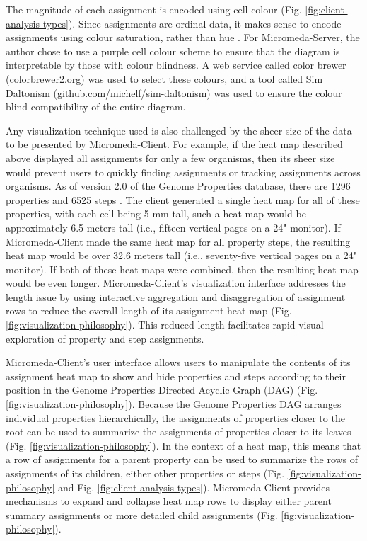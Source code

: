 The magnitude of each assignment is encoded using cell colour (Fig. \ref{fig:client-analysis-types}). Since assignments are ordinal data, it makes sense to encode assignments using colour saturation, rather than hue \cite{munzner2015visualization}. For Micromeda-Server, the author chose to use a purple cell colour scheme to ensure that the diagram is interpretable by those with colour blindness. A web service called color brewer (\href{colorbrewer2.org}{colorbrewer2.org}) was used to select these colours, and a tool called Sim Daltonism (\href{github.com/michelf/sim-daltonism}{github.com/michelf/sim-daltonism}) was used to ensure the colour blind compatibility of the entire diagram.

Any visualization technique used is also challenged by the sheer size of the data to be presented by Micromeda-Client. For example, if the heat map described above displayed all assignments for only a few organisms, then its sheer size would prevent users to quickly finding assignments or tracking assignments across organisms. As of version 2.0 of the Genome Properties database, there are 1296 properties and 6525 steps \cite{richardson2018genome}. The client generated a single heat map for all of these properties, with each cell being 5 mm tall, such a heat map would be approximately 6.5 meters tall (i.e., fifteen vertical pages on a 24" monitor). If Micromeda-Client made the same heat map for all property steps, the resulting heat map would be over 32.6 meters tall (i.e., seventy-five vertical pages on a 24" monitor). If both of these heat maps were combined, then the resulting heat map would be even longer. Micromeda-Client's visualization interface addresses the length issue by using interactive aggregation and disaggregation \cite{munzner2015visualization} of assignment rows to reduce the overall length of its assignment heat map (Fig. \ref{fig:visualization-philosophy}). This reduced length facilitates rapid visual exploration of property and step assignments.

Micromeda-Client's user interface allows users to manipulate the contents of its assignment heat map to show and hide properties and steps according to their position in the Genome Properties Directed Acyclic Graph (DAG) \cite{richardson2018genome} (Fig. \ref{fig:visualization-philosophy}). Because the Genome Properties DAG arranges individual properties hierarchically, the assignments of properties closer to the root can be used to summarize the assignments of properties closer to its leaves (Fig. \ref{fig:visualization-philosophy}). In the context of a heat map, this means that a row of assignments for a parent property can be used to summarize the rows of assignments of its children, either other properties or steps (Fig. \ref{fig:visualization-philosophy} and Fig. \ref{fig:client-analysis-types}). Micromeda-Client provides mechanisms to expand and collapse heat map rows to display either parent summary assignments or more detailed child assignments (Fig. \ref{fig:visualization-philosophy}).

